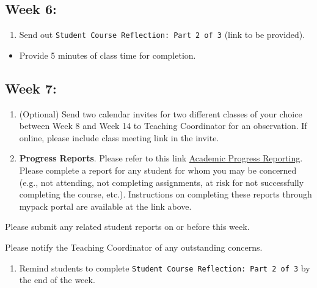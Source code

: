 \documentclass[
]{book}
\providecommand{\tightlist}{%
  \setlength{\itemsep}{0pt}\setlength{\parskip}{0pt}}
\begin{document}
\hypertarget{week-6}{%
\subsection{Week 6:}\label{week-6}}

\begin{enumerate}
\def\labelenumi{\arabic{enumi})}
\tightlist
\item
  Send out \texttt{Student\ Course\ Reflection:\ Part\ 2\ of\ 3} (link to be provided).
\end{enumerate}

\begin{itemize}
\tightlist
\item
  Provide 5 minutes of class time for completion.
\end{itemize}

\hypertarget{week-7}{%
\subsection{Week 7:}\label{week-7}}

\begin{enumerate}
\def\labelenumi{\arabic{enumi})}
\item
  (Optional) Send two calendar invites for two different classes of your choice between Week 8 and Week 14 to Teaching Coordinator for an observation. If online, please include class meeting link in the invite.
\item
  \textbf{Progress Reports}. Please refer to this link \href{https://dasa.ncsu.edu/faculty-resources/academic-progress-reporting/}{Academic Progress Reporting}. Please complete a report for any student for whom you may be concerned (e.g., not attending, not completing assignments, at risk for not successfully completing the course, etc.). Instructions on completing these reports through mypack portal are available at the link above.
\end{enumerate}

Please submit any related student reports on or before this week.

Please notify the Teaching Coordinator of any outstanding concerns.

\begin{enumerate}
\def\labelenumi{\arabic{enumi})}
\setcounter{enumi}{2}
\tightlist
\item
  Remind students to complete \texttt{Student\ Course\ Reflection:\ Part\ 2\ of\ 3} by the end of the week.
\end{enumerate}
\end{document}
